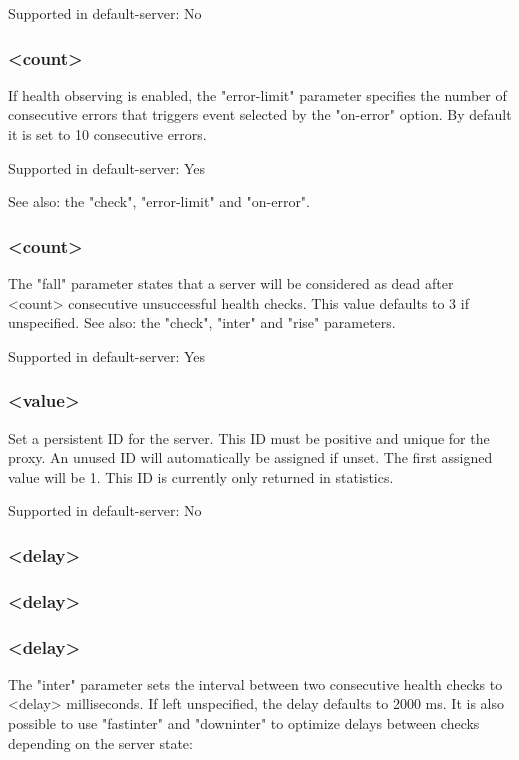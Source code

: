   Supported in default-server: No

\subsubsection[error-limit]{ <count>}
  If health observing is enabled, the "error-limit" parameter specifies the
  number of consecutive errors that triggers event selected by the "on-error"
  option. By default it is set to 10 consecutive errors.

  Supported in default-server: Yes

  See also: the "check", "error-limit" and "on-error".

\subsubsection[fall]{ <count>}
  The "fall" parameter states that a server will be considered as dead after
  <count> consecutive unsuccessful health checks. This value defaults to 3 if
  unspecified. See also: the "check", "inter" and "rise" parameters.

  Supported in default-server: Yes

\subsubsection[id]{ <value>}
  Set a persistent ID for the server. This ID must be positive and unique for
  the proxy. An unused ID will automatically be assigned if unset. The first
  assigned value will be 1. This ID is currently only returned in statistics.

  Supported in default-server: No

\subsubsection[inter]{ <delay>}
\subsubsection[fastinter]{ <delay>}
\subsubsection[downinter]{ <delay>}
  The "inter" parameter sets the interval between two consecutive health checks
  to <delay> milliseconds. If left unspecified, the delay defaults to 2000 ms.
  It is also possible to use "fastinter" and "downinter" to optimize delays
  between checks depending on the server state:

